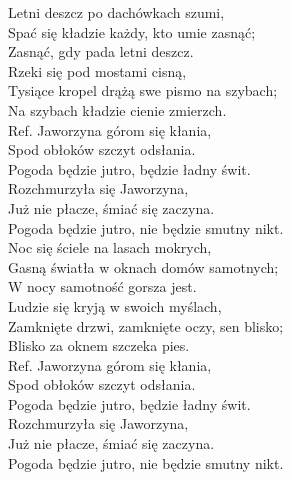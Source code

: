 
\begin{flushleft}
Letni deszcz po dachówkach szumi, \\
Spać się kładzie każdy, kto umie zasnąć; \\
Zasnąć, gdy pada letni deszcz. \tab{}\\
Rzeki się pod mostami cisną, \tab{}\\
Tysiące kropel drążą swe pismo na szybach; \\
Na szybach kładzie cienie zmierzch. \\
\vskip 3mm
Ref. Jaworzyna górom się kłania, \tab{}\\
\hspace{0.9cm}Spod obłoków szczyt odsłania. \tab{}\\
\hspace{0.9cm}Pogoda będzie jutro, będzie ładny świt. \tab{}\\
\hspace{0.9cm}Rozchmurzyła się Jaworzyna, \tab{}\\
\hspace{0.9cm}Już nie płacze, śmiać się zaczyna. \tab{}\\
\hspace{0.9cm}Pogoda będzie jutro, nie będzie smutny nikt. \\
\vskip 3mm
Noc się ściele na lasach mokrych, \\
Gasną światła w oknach domów samotnych; \\
W nocy samotność gorsza jest. \\
Ludzie się kryją w swoich myślach, \\
Zamknięte drzwi, zamknięte oczy, sen blisko; \\
Blisko za oknem szczeka pies. \\
\vskip 3mm
Ref. Jaworzyna górom się kłania, \\
\hspace{0.9cm}Spod obłoków szczyt odsłania. \\
\hspace{0.9cm}Pogoda będzie jutro, będzie ładny świt. \\
\hspace{0.9cm}Rozchmurzyła się Jaworzyna, \\
\hspace{0.9cm}Już nie płacze, śmiać się zaczyna. \\
\hspace{0.9cm}Pogoda będzie jutro, nie będzie smutny nikt. \\
\end{flushleft}
\clearpage

